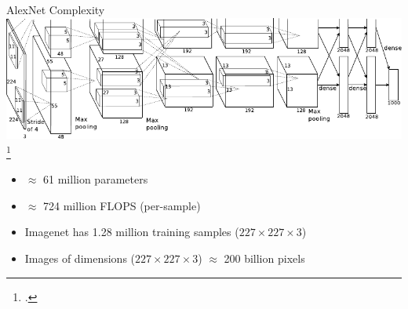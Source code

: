\documentclass[t,xcolor=dvipsnames]{beamer}
\begin{document}
\begin{frame}{AlexNet Complexity}
\includegraphics[width=\columnwidth]{alexnet}\footcite{Krizhevsky2012}
\begin{itemize}
\item $\approx$ 61 million parameters %
\item $\approx$ 724 million FLOPS (per-sample) %
\item Imagenet has 1.28 million training samples ($227 \times 227 \times 3$) %
\item Images of dimensions  ($227 \times 227 \times 3$) $\approx$ 200 billion pixels %
\end{itemize}
\end{frame}


\datatable
{}\datatableours
{}\datatableaug
{}
\end{document}
